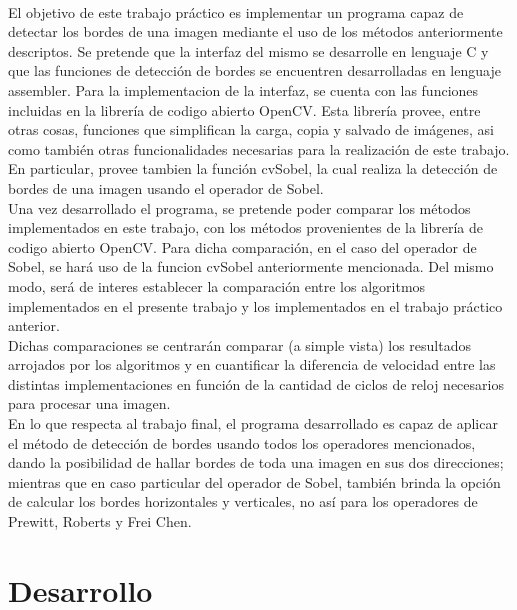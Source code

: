 \documentclass[11pt, a4paper]{article}
\begin{document}
\paragraph{}
El objetivo de este trabajo pr\'actico es implementar un programa capaz de detectar los bordes de una imagen mediante el uso de los m\'etodos anteriormente descriptos. Se pretende que la interfaz del mismo se desarrolle en lenguaje C y que las funciones de detecci\'on de bordes se encuentren desarrolladas en lenguaje assembler.
Para la implementacion de la interfaz, se cuenta con las funciones incluidas en la librer\'ia de codigo abierto OpenCV. Esta librer\'ia provee, entre otras cosas, funciones que simplifican la carga, copia y salvado de im\'agenes, asi como tambi\'en otras funcionalidades necesarias para la realizaci\'on de este trabajo. En particular, provee tambien la funci\'on cvSobel, la cual realiza la detecci\'on de bordes de una imagen usando el operador de Sobel.\\

Una vez desarrollado el programa, se pretende poder comparar los m\'etodos implementados en este trabajo, con los m\'etodos provenientes de la librer\'ia de codigo abierto OpenCV. Para dicha comparaci\'on, en el caso del operador de Sobel, se har\'a uso de la funcion cvSobel anteriormente mencionada. Del mismo modo, ser\'a de interes establecer la comparaci\'on entre los algoritmos implementados en el presente trabajo y los implementados en el trabajo pr\'actico anterior.\\
Dichas comparaciones se centrar\'an comparar (a simple vista) los resultados arrojados por los algoritmos y en cuantificar la diferencia de velocidad entre las distintas implementaciones en funci\'on de la cantidad de ciclos de reloj necesarios para procesar una imagen.\\

En lo que respecta al trabajo final, el programa desarrollado es capaz de aplicar el m\'etodo de detecci\'on de bordes usando todos los operadores mencionados, dando la posibilidad de hallar bordes de toda una imagen en sus dos direcciones; mientras que en caso particular del operador de Sobel, tambi\'en brinda la opci\'on de calcular los bordes horizontales y verticales, no as\'i para los operadores de Prewitt, Roberts y Frei Chen.

\newpage

\section{Desarrollo}
\end{document}
